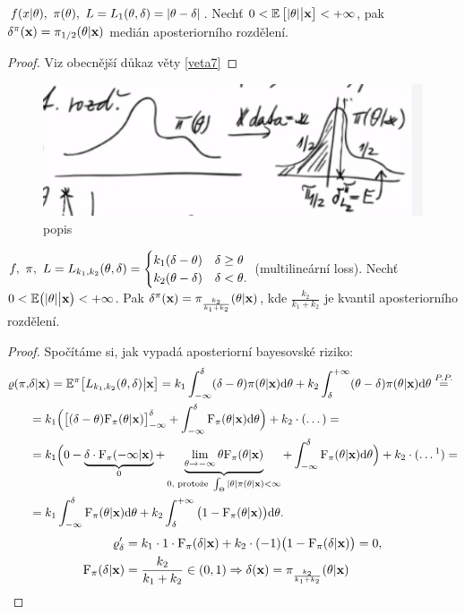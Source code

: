 \begin{theorem}
$f(x|\theta),~\pi(\theta),~L=L_1(\theta,\delta)=|\theta-\delta|$. Nechť $0<\mathbb{E}\left[ |\theta|\big|\textbf{x} \right]<+\infty$, pak $\delta^\pi(\textbf{x})=\pi_{1/2}(\theta|\textbf{x})$ medián aposteriorního rozdělení.
\begin{proof}
Viz obecnější důkaz věty \ref{veta7}
\end{proof}
\end{theorem}
		\begin{figure}[h]
			\centering
			\includegraphics[width=0.7\linewidth]{pictures/10.12}
			\caption{popis}
			\label{fig:10}
		\end{figure}
		\FloatBarrier
\begin{theorem}\label{veta7}
$f,~\pi,~L=L_{k_1,k_2}(\theta,\delta)=\begin{cases}
		k_1(\delta-\theta)&\delta\geq \theta \\ k_2(\theta-\delta)& \delta<\theta.
		\end{cases}$ (multilineární loss). Nechť $0<\mathbb{E}\big(|\theta|\big|\textbf{x}\big)<+\infty$. Pak $\delta^\pi(\textbf{x})=\pi_{\frac{k_2}{k_1+k_2}}(\theta|\textbf{x})$, kde $\frac{k_2}{k_1+k_2}$ je kvantil aposteriorního rozdělení.		
		\begin{proof}
		Spočítáme si, jak vypadá aposteriorní bayesovské riziko:
			\[
			\begin{split}
			\rho(\pi,&\delta|\textbf{x})=\E^{\pi}\big[L_{k_1,k_2}(\t,\delta)\big| \textbf{x}\big]=k_1\int_{-\infty}^\delta (\delta-\t)\pi(\t|\textbf{x})\d\t+k_2\int_\delta^{+\infty}(\t-\delta)\pi(\t|\textbf{x})\d\t\stackrel{P.P.}{=}\\
			&=k_1\Big(\big[(\delta-\t)\FF_\pi(\t|\textbf{x})\big]_{-\infty}^\delta+\int_{-\infty}^\delta \FF_\pi(\t|\textbf{x})\d\t\Big)+k_2\cdot (\dots)=\\
			&=k_1\Big( 0-\underbrace{\delta\cdot\FF_\pi(-\infty|\textbf{x})}_{0}+\underbrace{\lim\limits_{\t\to-\infty}\t\FF_\pi(\t|\textbf{x})}_{0\text{, protože }\int_\Theta |\t|\pi(\t|\textbf{x})<\infty}+\int_{-\infty}^\delta \FF_\pi(\t|\textbf{x})\d\t \Big)+k_2\cdot (\dots\text{\footnotemark})=\\
			&=k_1\int_{-\infty}^\delta \FF_\pi(\t|\textbf{x})\d\t+k_2\int_\delta^{+\infty}\big(1-\FF_\pi(\t|\textbf{x})\big)\d\t.
			\end{split}
			\]
			\[
			\begin{split}
			\varrho_\delta'&=k_1\cdot 1\cdot\mathrm{F}_\pi(\delta|\textbf{x})+k_2\cdot(-1)\big(1-\mathrm{F}_\pi(\delta|\textbf{x})\big)=0,\\
			\mathrm{F}_\pi(\delta|\textbf{x})&=\frac{k_2}{k_1+k_2}\in(0,1)\Rightarrow \delta(\textbf{x})=\pi_{\frac{k_2}{k_1+k_2}}(\theta|\textbf{x})
			\end{split}
			\]
		\end{proof} 

	
\end{theorem}
